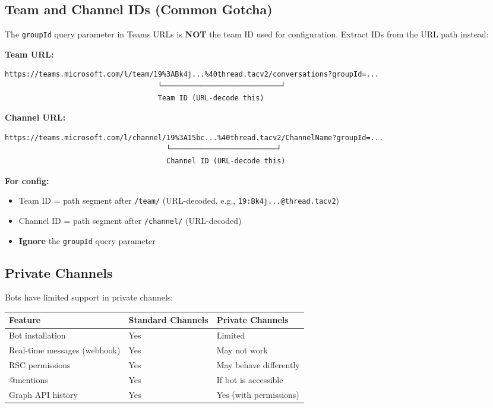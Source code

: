 \subsection{Team and Channel IDs (Common Gotcha)}


The \texttt{groupId} query parameter in Teams URLs is \textbf{NOT} the team ID used for configuration. Extract IDs from the URL path instead:

\textbf{Team URL:}

\begin{lstlisting}
https://teams.microsoft.com/l/team/19%3ABk4j...%40thread.tacv2/conversations?groupId=...
                                    └────────────────────────────┘
                                    Team ID (URL-decode this)
\end{lstlisting}


\textbf{Channel URL:}

\begin{lstlisting}
https://teams.microsoft.com/l/channel/19%3A15bc...%40thread.tacv2/ChannelName?groupId=...
                                      └─────────────────────────┘
                                      Channel ID (URL-decode this)
\end{lstlisting}


\textbf{For config:}

\begin{itemize}
  \item Team ID = path segment after \texttt{/team/} (URL-decoded, e.g., \texttt{19:Bk4j...@thread.tacv2})
  \item Channel ID = path segment after \texttt{/channel/} (URL-decoded)
  \item \textbf{Ignore} the \texttt{groupId} query parameter
\end{itemize}


\subsection{Private Channels}


Bots have limited support in private channels:


\begin{table}[h]
\centering
\small
\begin{tabular}{|l|l|l|}
\hline
Feature & Standard Channels & Private Channels \\
\hline
Bot installation & Yes & Limited \\
\hline
Real-time messages (webhook) & Yes & May not work \\
\hline
RSC permissions & Yes & May behave differently \\
\hline
@mentions & Yes & If bot is accessible \\
\hline
Graph API history & Yes & Yes (with permissions) \\
\hline
\end{tabular}
\end{table}



